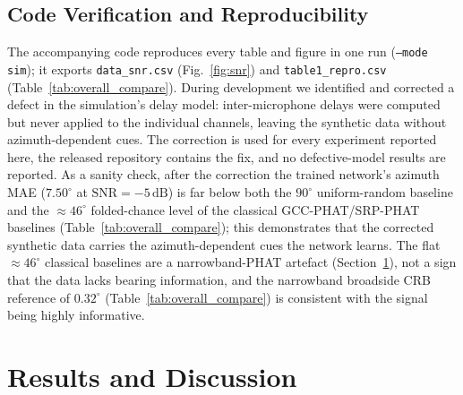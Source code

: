 \documentclass[5p,twocolumn]{elsarticle}
\begin{document}
\subsection{Code Verification and Reproducibility}
\label{sec:repro}
The accompanying code reproduces every table and figure in one run (\texttt{--mode sim}); it exports \texttt{data\_snr.csv} (Fig.~\ref{fig:snr}) and \texttt{table1\_repro.csv} (Table~\ref{tab:overall_compare}). During development we identified and corrected a defect in the simulation's delay model: inter-microphone delays were computed but never applied to the individual channels, leaving the synthetic data without azimuth-dependent cues. The correction is used for every experiment reported here, the released repository contains the fix, and no defective-model results are reported. As a sanity check, after the correction the trained network's azimuth MAE ($7.50^\circ$ at $\mathrm{SNR}=-5\,\mathrm{dB}$) is far below both the $90^\circ$ uniform-random baseline and the $\approx46^\circ$ folded-chance level of the classical GCC-PHAT/SRP-PHAT baselines (Table~\ref{tab:overall_compare}); this demonstrates that the corrected synthetic data carries the azimuth-dependent cues the network learns. The flat $\approx46^\circ$ classical baselines are a narrowband-PHAT artefact (Section~\ref{sec:results}), not a sign that the data lacks bearing information, and the narrowband broadside CRB reference of $0.32^\circ$ (Table~\ref{tab:overall_compare}) is consistent with the signal being highly informative.

\section{Results and Discussion}
\label{sec:results}
\end{document}
